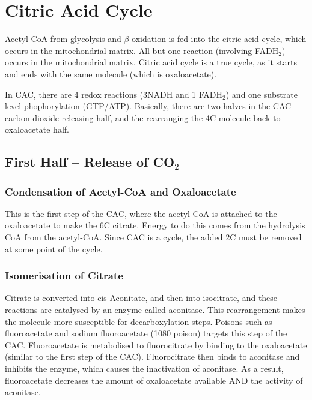 \section{Citric Acid Cycle}

Acetyl-CoA from glycolysis and $\beta$-oxidation is fed into the citric acid cycle, which occurs in the mitochondrial matrix.
All but one reaction (involving FADH$_2$) occurs in the mitochondrial matrix.
Citric acid cycle is a true cycle, as it starts and ends with the same molecule (which is oxaloacetate).

In CAC, there are 4 redox reactions (3NADH and 1 FADH$_2$) and one substrate level phophorylation (GTP/ATP).
Basically, there are two halves in the CAC -- carbon dioxide releasing half, and the rearranging the 4C molecule back to oxaloacetate half.

\subsection{First Half -- Release of CO$_2$}

\subsubsection{Condensation of Acetyl-CoA and Oxaloacetate}

This is the first step of the CAC, where the acetyl-CoA is attached to the oxaloacetate to make the 6C citrate.
Energy to do this comes from the hydrolysis CoA from the acetyl-CoA.
Since CAC is a cycle, the added 2C must be removed at some point of the cycle.

\subsubsection{Isomerisation of Citrate}

Citrate is converted into cis-Aconitate, and then into isocitrate, and these reactions are catalysed by an enzyme called aconitase.
This rearrangement makes the molecule more susceptible for decarboxylation steps.
Poisons such as fluoroacetate and sodium fluoroacetate (1080 poison) targets this step of the CAC.
Fluoroacetate is metabolised to fluorocitrate by binding to the oxaloacetate (similar to the first step of the CAC).
Fluorocitrate then binds to aconitase and inhibits the enzyme, which causes the inactivation of aconitase.
As a result, fluoroacetate decreases the amount of oxaloacetate available AND the activity of aconitase.

